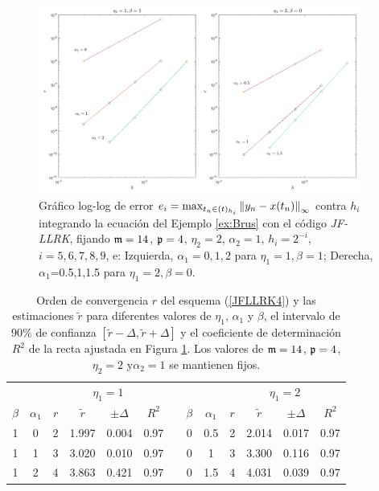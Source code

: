 \begin{figure}[htb]
	\centering
	\includegraphics[width=0.95\textwidth]{Graphics/lldp-fj/in_new.png}
	\caption{Gráfico log-log de error $e_i=\max_{t_n\in(t)_{h_i}}\left\lVert y_n-x(t_n) \right\rVert_\infty$ contra $h_i$ integrando la ecuación del Ejemplo \ref{ex:Brus} con el código \textit{JF-LLRK}, fijando $\mathfrak{m}=14$, $\mathfrak{p}=4$, $\eta_2=2$, $\alpha_2=1$, $h_i=2^{-i}$, $i=5,6,7,8,9$, e: Izquierda, $\alpha_1=0,1,2$ para $\eta_1=1,\beta=1$; Derecha, $\alpha_1$=0.5,1,1.5 para $\eta_1=2,\beta=0$.}
	\label{Fig3}
\end{figure}

\vspace{0.3cm}

\begin{table}[htb]
	\centering
	\caption{
        Orden de convergencia $r$ del esquema (\ref{JFLLRK4}) y las estimaciones $\widetilde{r}$ para diferentes valores de  $\eta_1$, $\alpha_1$ y $\beta$, el intervalo de $90\%$ de confianza $[\widetilde{r}-\varDelta,\widetilde{r}+\varDelta]$ y el coeficiente de determinación $R^2$ de la recta ajustada en Figura \ref{Fig3}. Los valores de $\mathfrak{m}=14$, $\mathfrak{p}=4$, $\eta_2=2$ y$\alpha_2=1$ se mantienen fijos.}
	\begin{adjustbox}{width=0.8\columnwidth,center}
		\begin{tabular}{ccccccccccccc}
			\hline
			&  & \multicolumn{4}{c}{$\eta _{1}=1$} &  &  &  & \multicolumn{4}{c}{$\eta
				_{1}=2$} \\ \cline{3-6}\cline{10-13}
			$\beta $ & $\alpha _{1}$ & $r$ & $\widetilde{r}$ & $\pm \varDelta$ & $R^{2}$
			&  & $\beta $ & $\alpha _{1}$ & $r$ & $\widetilde{r}$ & $\pm \varDelta$ & $%
			R^{2}$ \\ \hline
			1 & 0 & 2 & 1.997 & 0.004 & 0.97 &  & 0 & 0.5 & 2 & 2.014 & 0.017 & 0.97 \\
			1 & 1 & 3 & 3.020 & 0.010 & 0.97 &  & 0 & 1 & 3 & 3.300 & 0.116 & 0.97 \\
			1 & 2 & 4 & 3.863 & 0.421 & 0.97 &  & 0 & 1.5 & 4 & 4.031 & 0.039 & 0.97 \\
			\hline
		\end{tabular}
	\end{adjustbox}
	\label{tab:in}
\end{table}

